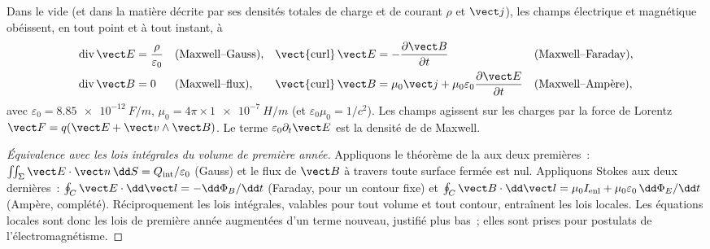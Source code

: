 \begin{theorem}\label{thm:b2:maxwell-equations:maxwell}
Dans le vide (et dans la matière décrite par ses densités totales de charge et de
courant $\rho$ et $\vect j$), les champs électrique et magnétique obéissent, en
tout point et à tout instant, à
\begin{align*}
\operatorname{div}\vect E &= \frac\rho{\varepsilon_0} &&\text{(Maxwell--Gauss)} , &
\operatorname{\vect{curl}}\vect E &= -\frac{\partial\vect B}{\partial t} &&\text{(Maxwell--Faraday)} ,\\
\operatorname{div}\vect B &= 0 &&\text{(Maxwell--flux)} , &
\operatorname{\vect{curl}}\vect B &= \mu_0\vect j + \mu_0\varepsilon_0\frac{\partial\vect E}{\partial t} &&\text{(Maxwell--Ampère)} ,
\end{align*}
avec $\varepsilon_0 = \qty{8.85e-12}{F/m}$, $\mu_0 = 4\pi \times \qty{1e-7}{H/m}$ (et
$\varepsilon_0\mu_0 = 1/c^2$). Les champs agissent sur les charges par la force de
Lorentz $\vect F = q(\vect E + \vect v\wedge\vect B)$. Le terme $\varepsilon_0\partial_t\vect E$
est la densité de \emph{} de Maxwell.
\end{theorem}

\begin{proof}[Équivalence avec les lois intégrales du volume de première année]
Appliquons le théorème de la  aux deux premières~: $\iint_\Sigma\vect E\cdot
\vect n\,\dd S = Q_{\text{int}}/\varepsilon_0$ (Gauss) et le flux de $\vect B$
à travers toute surface fermée est nul. Appliquons Stokes aux deux dernières~:
$\oint_C\vect E\cdot\dd\vect l = -\dd\Phi_B/\dd t$ (Faraday, pour un contour fixe)
et $\oint_C\vect B\cdot\dd\vect l = \mu_0I_{\text{enl}} + \mu_0\varepsilon_0\,\dd\Phi_E/\dd t$
(Ampère, complété). Réciproquement les lois intégrales, valables pour tout
volume et tout contour, entraînent les lois locales. Les équations locales sont donc
les lois de première année augmentées d'un terme nouveau, justifié plus bas~; elles sont prises pour
postulats de l'électromagnétisme.
\end{proof}

